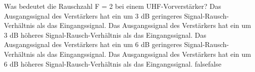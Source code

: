    {Was bedeutet die Rauschzahl F = 2 bei einem UHF-Vorverstärker?}
    {Das Ausgangssignal des Verstärkers hat ein um 3 dB geringeres Signal-Rausch-Verhältnis als das Eingangssignal.}
    {Das Ausgangssignal des Verstärkers hat ein um 3 dB höheres Signal-Rausch-Verhältnis als das Eingangssignal.}
    {Das Ausgangssignal des Verstärkers hat ein um 6 dB geringeres Signal-Rausch-Verhältnis als das Eingangssignal.}
    {Das Ausgangssignal des Verstärkers hat ein um 6 dB höheres Signal-Rausch-Verhältnis als das Eingangssignal.}
    {false}{false}